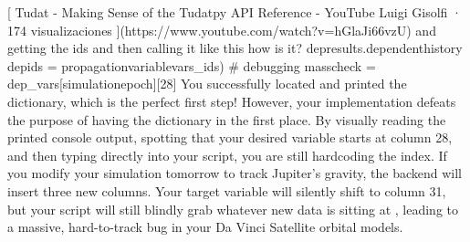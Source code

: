 {}[\markdownRendererInterblockSeparator
{}\markdownRendererInterblockSeparator
{}Tudat - Making Sense of the Tudatpy API Reference - YouTube\markdownRendererInterblockSeparator
{}Luigi Gisolfi · 174 visualizaciones\markdownRendererInterblockSeparator
{}](https://www.youtube.com/watch?v=hGlaJi66vzU)\markdownRendererInterblockSeparator
{}\markdownRendererInterblockSeparator
{}\markdownRendererInterblockSeparator
{}\markdownRendererThematicBreak{}\markdownRendererInterblockSeparator
{}
\markdownRendererSectionEnd 
\markdownRendererSectionEnd \markdownRendererSectionBegin
{}\markdownRendererInterblockSeparator
{}and getting the ids and then calling it like this how is it? depresults.dependenthistory depids = propagationvariablevars_ids) # debugging\markdownRendererInterblockSeparator
{}
\markdownRendererSectionEnd 
\markdownRendererSectionEnd \markdownRendererSectionBegin
{}\markdownRendererInterblockSeparator
{}masscheck = dep_vars[simulationepoch][28]\markdownRendererInterblockSeparator
{}\markdownRendererSectionBegin
{}\markdownRendererInterblockSeparator
{}\markdownRendererSectionBegin
{}\markdownRendererInterblockSeparator
{}You successfully located and printed the dictionary, which is the perfect first step! However, your implementation defeats the purpose of having the dictionary in the first place.\markdownRendererInterblockSeparator
{}By visually reading the printed console output, spotting that your desired variable starts at column 28, and then typing \markdownRendererCodeSpan{[28]} directly into your script, you are still hardcoding the index.\markdownRendererInterblockSeparator
{}If you modify your simulation tomorrow to track Jupiter's gravity, the backend will insert three new columns. Your target variable will silently shift to column 31, but your script will still blindly grab whatever new data is sitting at \markdownRendererCodeSpan{[28]}, leading to a massive, hard-to-track bug in your Da Vinci Satellite orbital models.\markdownRendererInterblockSeparator
